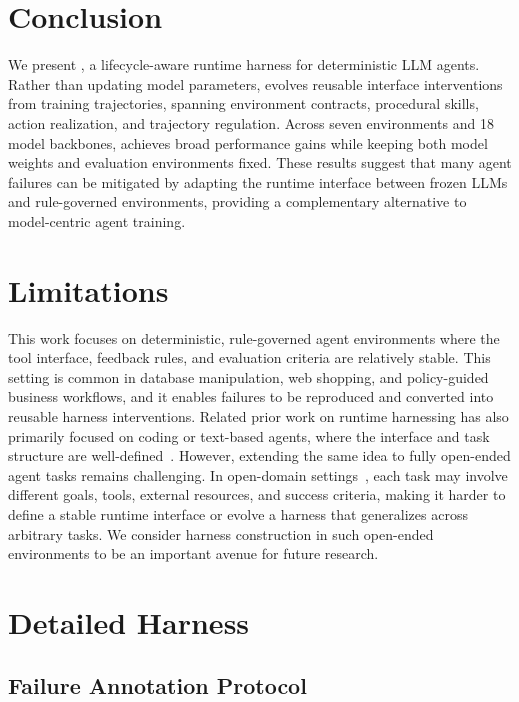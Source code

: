 \section{Conclusion}
We present \method{}, a lifecycle-aware runtime harness for deterministic LLM agents. 
Rather than updating model parameters, \method{} evolves reusable interface interventions from training trajectories, spanning environment contracts, procedural skills, action realization, and trajectory regulation. 
Across seven environments and 18 model backbones, \method{} achieves broad performance gains while keeping both model weights and evaluation environments fixed. 
These results suggest that many agent failures can be mitigated by adapting the runtime interface between frozen LLMs and rule-governed environments, providing a complementary alternative to model-centric agent training.

\section*{Limitations}

This work focuses on deterministic, rule-governed agent environments where the tool interface, feedback rules, and evaluation criteria are relatively stable. 
This setting is common in database manipulation, web shopping, and policy-guided business workflows, and it enables failures to be reproduced and converted into reusable harness interventions. 
Related prior work on runtime harnessing has also primarily focused on coding or text-based agents, where the interface and task structure are well-defined~\cite{lee2026meta_Meta-harness,lin2026agentic}. 
However, extending the same idea to fully open-ended agent tasks remains challenging. 
In open-domain settings~\cite{ye2026claw}, each task may involve different goals, tools, external resources, and success criteria, making it harder to define a stable runtime interface or evolve a harness that generalizes across arbitrary tasks. 
We consider harness construction in such open-ended environments to be an important avenue for future research.

\appendix
\section{Detailed Harness}
\subsection{Failure Annotation Protocol}
\label{app:failure-taxonomy}

